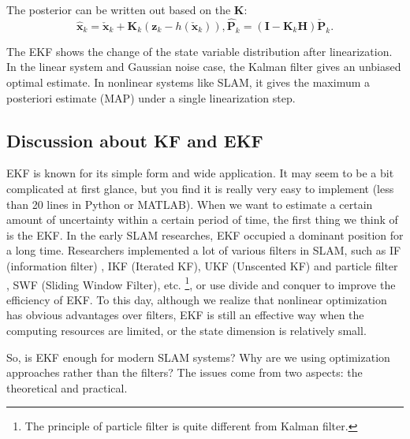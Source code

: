 The posterior can be written out based on the $\mathbf{K}$: 
\begin{equation}
	{{\mathbf{\hat x}}_k} = {{\mathbf{\check x}}_k} + {\mathbf{K}_k}\left( {{\mathbf{z}_k} - h\left( {{\mathbf{\check x}_k}} \right)} \right),{\mathbf{\hat P}_k} = \left( {\mathbf{I} - {\mathbf{K}_k}{\mathbf{H}}} \right) \mathbf{\check{P}}_k.
\end{equation}

The EKF shows the change of the state variable distribution after linearization. In the linear system and Gaussian noise case, the Kalman filter gives an unbiased optimal estimate. In nonlinear systems like SLAM, it gives the maximum a posteriori estimate (MAP) under a single linearization step. 

\subsection{Discussion about KF and EKF}
EKF is known for its simple form and wide application. It may seem to be a bit complicated at first glance, but you find it is really very easy to implement (less than 20 lines in Python or MATLAB).  When we want to estimate a certain amount of uncertainty within a certain period of time, the first thing we think of is the EKF. In the early SLAM researches, EKF occupied a dominant position for a long time. Researchers implemented a lot of various filters in SLAM, such as IF (information filter)\textsuperscript{\cite{Sujan2005} }, IKF\textsuperscript{\cite{Janabi-Sharifi2010}} (Iterated KF), UKF\textsuperscript{\cite{Li2010}} (Unscented KF) and particle filter \textsuperscript{\cite{Sim2007, Lee2011, Gil2010a}} , SWF (Sliding Window \mbox{Filter)\textsuperscript{\cite{Sibley2010}}}, etc.\textsuperscript{\cite{Chen2012}} \footnote{The principle of particle filter is quite different from Kalman filter. }, or use divide and conquer to improve the efficiency of EKF\textsuperscript{\cite{Paz2008, Grasa2011}}. To this day, although we realize that nonlinear optimization has obvious advantages over filters, EKF is still an effective way when the computing resources are limited, or the state dimension is relatively small.

So, is EKF enough for modern SLAM systems? Why are we using optimization approaches rather than the filters? The issues come from two aspects: the theoretical and practical. 


